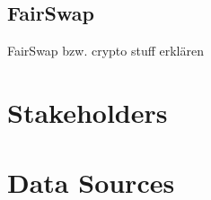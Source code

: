\subsection{FairSwap}
\label{subsection:fairswap}

FairSwap bzw. crypto stuff erklären

\section{Stakeholders}
\label{section:stakeholders}

\section{Data Sources}
\label{section:datasource}



